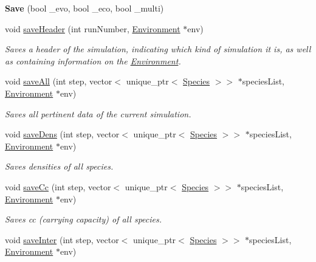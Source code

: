 \begin{DoxyCompactItemize}
\item 
\hypertarget{classSave_af60832ca49a38a2569cc78182a2fe8e8}{}\label{classSave_af60832ca49a38a2569cc78182a2fe8e8} 
{\bfseries Save} (bool \+\_\+evo, bool \+\_\+eco, bool \+\_\+multi)
\item 
\hypertarget{classSave_aa59686b2d793182bb2f2d5997f4f5927}{}\label{classSave_aa59686b2d793182bb2f2d5997f4f5927} 
void \hyperlink{classSave_aa59686b2d793182bb2f2d5997f4f5927}{save\+Header} (int run\+Number, \hyperlink{classEnvironment}{Environment} $\ast$env)
\begin{DoxyCompactList}\small\item\em Saves a header of the simulation, indicating which kind of simulation it is, as well as containing information on the \hyperlink{classEnvironment}{Environment}. \end{DoxyCompactList}\item 
void \hyperlink{classSave_ae3cf638e17bf975565ccdd5188a5c156}{save\+All} (int step, vector$<$ unique\+\_\+ptr$<$ \hyperlink{classSpecies}{Species} $>$$>$ $\ast$species\+List, \hyperlink{classEnvironment}{Environment} $\ast$env)
\begin{DoxyCompactList}\small\item\em Saves all pertinent data of the current simulation. \end{DoxyCompactList}\item 
void \hyperlink{classSave_a2e80fc292e7fcea2b327bc7016f34331}{save\+Dens} (int step, vector$<$ unique\+\_\+ptr$<$ \hyperlink{classSpecies}{Species} $>$$>$ $\ast$species\+List, \hyperlink{classEnvironment}{Environment} $\ast$env)
\begin{DoxyCompactList}\small\item\em Saves densities of all species. \end{DoxyCompactList}\item 
void \hyperlink{classSave_a76a537b2f22ae64e63ffaf00e625b955}{save\+Cc} (int step, vector$<$ unique\+\_\+ptr$<$ \hyperlink{classSpecies}{Species} $>$$>$ $\ast$species\+List, \hyperlink{classEnvironment}{Environment} $\ast$env)
\begin{DoxyCompactList}\small\item\em Saves cc (carrying capacity) of all species. \end{DoxyCompactList}\item 
void \hyperlink{classSave_af446df59d19910cd6042680d419b3948}{save\+Inter} (int step, vector$<$ unique\+\_\+ptr$<$ \hyperlink{classSpecies}{Species} $>$$>$ $\ast$species\+List, \hyperlink{classEnvironment}{Environment} $\ast$env)

\end{DoxyCompactItemize}
